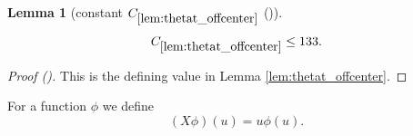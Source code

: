 \documentclass[12pt,reqno]{amsart}
\newcommand{\auto}{{({\tiny\faCar})}}
\theoremstyle{plain}
\newtheorem{lemma}[theorem]{Lemma}
\numberwithin{equation}{section}
\theoremstyle{remark}
\newcommand{\uses}[1]{}
\newcommand{\usesdefs}[1]{}
\begin{document}
\begin{lemma}[constant $C_{\ref{lem:thetat_offcenter}}$ \auto]\label{constant off center bump}\uses{lem:thetat_offcenter}\usesdefs{}
\begin{equation}\label{constant off center bump bound}
C_{\ref{lem:thetat_offcenter}}\le133.
\end{equation}
\end{lemma}
\begin{proof}[Proof \auto]
This is the defining value in Lemma \ref{lem:thetat_offcenter}.
\end{proof}


For a function $\phi$ we define
\begin{equation}\label{auto:multiplication-operator-X}(X\phi)(u) = u\phi(u).\end{equation}
\end{document}
